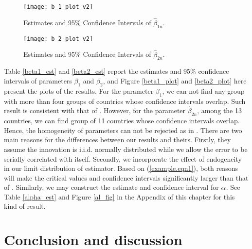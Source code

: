 \begin{figure}[hb]
  \centering
  \texttt{[image: b\_1\_plot\_v2]} \\
\caption{Estimates and 95\% Confidence Intervals of $\hat{\beta}_{1n}$.}

\end{figure}

\begin{figure}[hb]
  \centering
  \texttt{[image: b\_2\_plot\_v2]} \\
  \caption{Estimates and 95\% Confidence Intervals of $\hat{\beta}_{2n}$.}
\end{figure}

Table \ref{beta1_est} and \ref{beta2_est} report the estimates and 95\% confidence intervals of parameters $\beta_{1}$ and $\beta_{2}$, and Figure \ref{beta1_plot} and \ref{beta2_plot} here present the plots of the results. For the parameter $\beta_{1}$, we can not find any group with more than four groups of countries whose confidence intervals overlap. Such result is consistent with that of \cite{piaggiopadilla2010}. However, for the parameter $\hat{\beta}_{2n}$, among the 13 countries, we can find group of 11 countries whose confidence intervals overlap. Hence, the homogeneity of parameters can not be rejected as in \cite{piaggiopadilla2010}. There are two main reasons for the  differences between our results and theirs. Firstly, they assume the innovation is i.i.d. normally distributed while we allow the error to be serially correlated with itself. Secondly, we incorporate the effect of endogeneity in our limit distribution of estimator. Based on (\ref{example.eqn1}), both reasons will make the critical values and confidence intervals significantly larger than that of \cite{piaggiopadilla2010}. Similarly, we may construct the estimate and confidence interval for $\alpha$. See Table \ref{alpha_est} and Figure \ref{al_fig}  in the Appendix of this chapter for this kind of result.



\section{Conclusion and discussion} 

